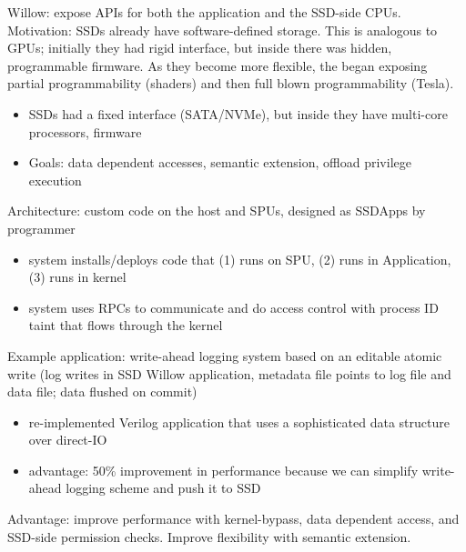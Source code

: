\documentclass{article}
\begin{document}
\noindent\cite{seshadri:osdi2014-willow} Willow: expose APIs for both the application and the SSD-side CPUs.\\
Motivation: SSDs already have software-defined storage. This is analogous to GPUs; initially they had rigid interface, but inside there was hidden, programmable firmware. As they become more flexible, the began exposing partial programmability (shaders) and then full blown programmability (Tesla).
\begin{itemize}
	\item SSDs had a fixed interface (SATA/NVMe), but inside they have multi-core processors, firmware
	\item Goals: data dependent accesses, semantic extension, offload privilege execution
\end{itemize}
Architecture: custom code on the host and SPUs, designed as SSDApps by programmer
\begin{itemize}
	\item system installs/deploys code that (1) runs on SPU, (2) runs in Application, (3) runs in kernel
	\item system uses RPCs to communicate and do access control with process ID taint that flows through the kernel
\end{itemize}
Example application: write-ahead logging system based on an editable atomic write (log writes in SSD Willow application, metadata file points to log file and data file; data flushed on commit)
\begin{itemize}
	\item re-implemented Verilog application that uses a sophisticated data structure over direct-IO
	\item advantage: 50\% improvement in performance because we can simplify write-ahead logging scheme and push it to SSD
\end{itemize}
Advantage: improve performance with kernel-bypass, data dependent access, and SSD-side permission checks. Improve flexibility with semantic extension. 


	





\newpage
\onecolumn
\appendix
\end{document}
